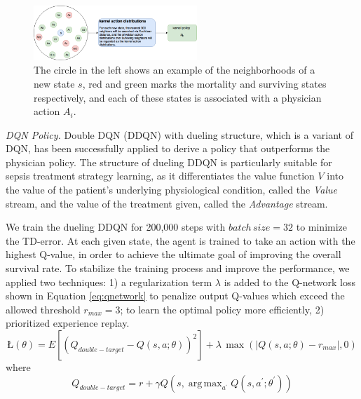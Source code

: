 \documentclass[10pt]{amia}
\DeclareMathOperator*{\argmax}{arg\,max}
\begin{document}
\begin{figure}[H]
\centering
\includegraphics[width=0.55\textwidth]{figures/kernel.png}
\caption{\label{fig:kernel_policy} The circle in the left shows an example of the neighborhoods of a new state $s$, red and green marks the mortality and surviving states respectively, and each of these states is associated with a physician action $A_{i}$.}
\end{figure} 

\textit{DQN Policy.} Double DQN (DDQN) with dueling structure\cite{wang2015dueling}, which is a variant of DQN, has been successfully applied to derive a policy that outperforms the physician policy\cite{DBLP:journals/corr/RaghuKCSG17}. The structure of dueling DDQN is particularly suitable for sepsis treatment strategy learning, as it differentiates the value function $V$ into the value of the patient's underlying physiological condition, called the \textit{Value} stream, and the value of the treatment given, called the \textit{Advantage} stream.  


We train the dueling DDQN for 200,000 steps with $batch\,size=32$ to minimize the TD-error. At each given state, the agent is trained to take an action with the highest Q-value, in order to achieve the ultimate goal of improving the overall survival rate.  To stabilize the training process and improve the performance, we applied two techniques: 1) a regularization term $\lambda$ is added to the Q-network loss shown in Equation \ref{eq:qnetwork} to penalize output Q-values which exceed the allowed threshold $r_{max}=3$; to learn the optimal policy more efficiently, 2) prioritized experience replay\cite{schaul2015prioritized}.
\begin{equation}
\label{eq:qnetwork}
\textit{\L}(\theta) = E[(Q_{double-target}-Q(s,a;\theta))^{2}] + \lambda\,\max(|Q(s,a;\theta)-r_{max}|, 0)
\end{equation}
where 
\begin{equation}
Q_{double-target} = r + \gamma Q(s,\argmax_{a^\prime} Q(s,a^\prime;\theta^\prime))
\end{equation}
\end{document}
